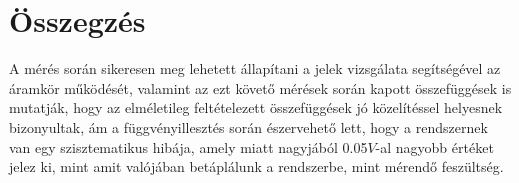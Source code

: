 \documentclass[10pt,pdftex]{report}
\begin{document}
\section*{Összegzés}
A mérés során sikeresen meg lehetett állapítani a jelek vizsgálata segítségével az áramkör működését, valamint az ezt követő mérések során 
kapott összefüggések is mutatják, hogy az elméletileg feltételezett összefüggések jó közelítéssel helyesnek bizonyultak, ám a függvényillesztés során észervehető lett, 
hogy a rendszernek van egy szisztematikus hibája, amely miatt nagyjából 0.05$V$-al nagyobb értéket jelez ki, mint amit valójában betáplálunk a rendszerbe, mint mérendő feszültség.



\end{document}
